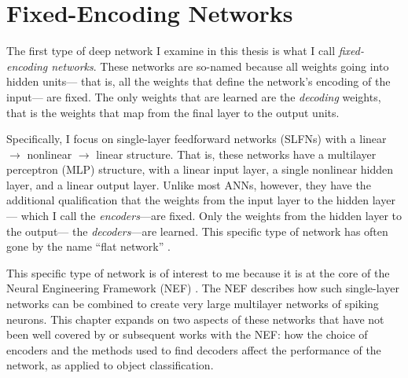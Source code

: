 \chapter{Fixed-Encoding Networks}

\newcommand{\Dec}{\Omega}
\newcommand{\dec}{\vect \omega}


The first type of deep network I examine in this thesis
is what I call \emph{fixed-encoding networks}.
These networks are so-named because all weights going into hidden units---%
that is, all the weights that define the network's encoding of the input---%
are fixed.
The only weights that are learned are the \emph{decoding} weights,
that is the weights that map from the final layer to the output units.

Specifically, I focus on single-layer feedforward networks (SLFNs)
with a linear $\to$ nonlinear $\to$ linear structure.
That is, these networks have a multilayer perceptron (MLP) structure,
with a linear input layer, a single nonlinear hidden layer,
and a linear output layer.
Unlike most ANNs, however, they have the additional qualification
that the weights from the input layer to the hidden layer---%
which I call the \emph{encoders}---are fixed.
Only the weights from the hidden layer to the output---%
the \emph{decoders}---are learned.
This specific type of network has often gone by the name
``flat network'' \parencite{Pao1992,Chen1999}.

This specific type of network is of interest to me
because it is at the core of the Neural Engineering Framework (NEF) \parencite{Eliasmith2003}.
The NEF describes how such single-layer networks
can be combined to create very large multilayer networks of spiking neurons.
This chapter expands on two aspects of these networks
that have not been well covered by \textcite{Eliasmith2003}
or subsequent works with the NEF:
how the choice of encoders and the methods used to find decoders
affect the performance of the network,
as applied to object classification.

